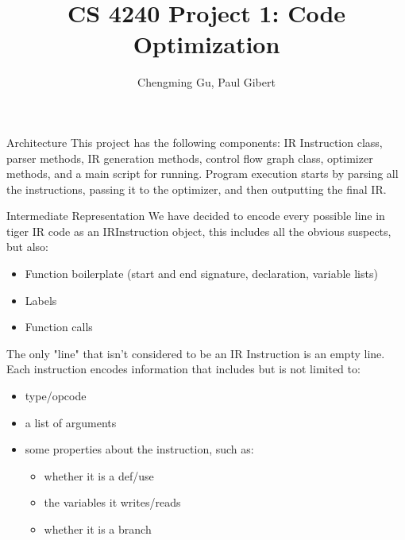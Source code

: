 \documentclass[letterpaper,12pt]{article}
\theoremstyle{definition}
\begin{document}
	\title{CS 4240 Project 1: Code Optimization}
	\author{Chengming Gu, Paul Gibert}
	\maketitle

	\begin{section}{Architecture}
		This project has the following components: IR Instruction class, parser methods, IR generation methods, control flow graph class, optimizer methods, and a main script for running. Program execution starts by parsing all the instructions, passing it to the optimizer, and then outputting the final IR.
		\begin{subsection}{Intermediate Representation}
			We have decided to encode every possible line in tiger IR code as an IRInstruction object, this includes all the obvious suspects, but also:
			\begin{itemize}
				\item Function boilerplate (start and end signature, declaration, variable lists)
				\item Labels
				\item Function calls
			\end{itemize}
			The only "line" that isn't considered to be an IR Instruction is an empty line. Each instruction encodes information that includes but is not limited to:
			\begin{itemize}
				\item type/opcode
				\item a list of arguments
				\item some properties about the instruction, such as:
					\begin{itemize}
						\item whether it is a def/use
						\item the variables it writes/reads
						\item whether it is a branch
					\end{itemize}
			\end{itemize}
		\end{subsection}


\end{section}
\end{document}
